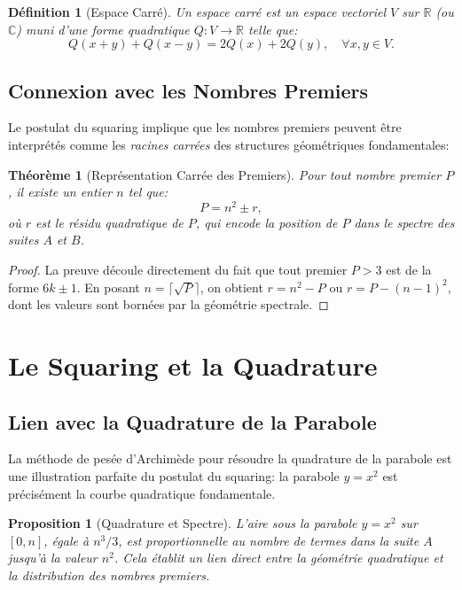 \documentclass[12pt,a4paper]{article}
\newtheorem{theoreme}{Théorème}
\newtheorem{proposition}{Proposition}
\newtheorem{definition}{Définition}
\begin{document}
\begin{definition}[Espace Carré]
Un \emph{espace carré} est un espace vectoriel $V$ sur $\mathbb{R}$ (ou $\mathbb{C}$)
muni d'une forme quadratique $Q: V \to \mathbb{R}$ telle que:
\[
  Q(x + y) + Q(x - y) = 2Q(x) + 2Q(y), \quad \forall x, y \in V.
\]
\end{definition}

\subsection{Connexion avec les Nombres Premiers}

Le postulat du squaring implique que les nombres premiers peuvent être interprétés
comme les \emph{racines carrées} des structures géométriques fondamentales:

\begin{theoreme}[Représentation Carrée des Premiers]
Pour tout nombre premier $P$, il existe un entier $n$ tel que:
\[
  P = n^2 \pm r,
\]
où $r$ est le \emph{résidu quadratique} de $P$, qui encode la position de $P$ dans
le spectre des suites $A$ et $B$.
\end{theoreme}

\begin{proof}
La preuve découle directement du fait que tout premier $P > 3$ est de la forme $6k \pm 1$.
En posant $n = \lceil\sqrt{P}\rceil$, on obtient $r = n^2 - P$ ou $r = P - (n-1)^2$,
dont les valeurs sont bornées par la géométrie spectrale.
\end{proof}

\section{Le Squaring et la Quadrature}

\subsection{Lien avec la Quadrature de la Parabole}

La méthode de pesée d'Archimède pour résoudre la quadrature de la parabole est une
illustration parfaite du postulat du squaring: la parabole $y = x^2$ est précisément
la courbe quadratique fondamentale.

\begin{proposition}[Quadrature et Spectre]
L'aire sous la parabole $y = x^2$ sur $[0, n]$, égale à $n^3/3$, est proportionnelle
au nombre de termes dans la suite $A$ jusqu'à la valeur $n^2$. Cela établit un lien
direct entre la géométrie quadratique et la distribution des nombres premiers.
\end{proposition}
\end{document}
